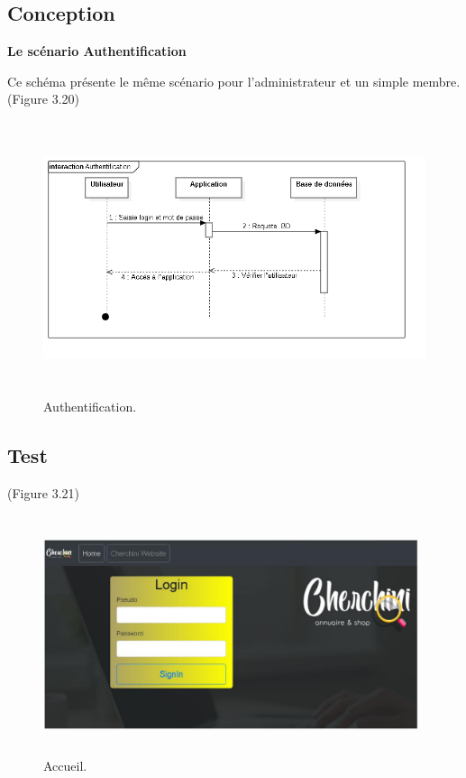 
\subsection{Conception}
\textbf{Le sc\'{e}nario \guillemotleft{} Authentification \guillemotright{}}

Ce sch\'{e}ma pr\'{e}sente le m\^{e}me sc\'{e}nario pour l'administrateur et un simple
membre.(Figure 3.20)

\begin{figure}[H]
\center
\includegraphics[width=14cm,height=8cm]{./figures/seq/A.png}
\caption{Authentification.}
\end{figure}

\newpage
\subsection{Test}

 (Figure 3.21)
\begin{figure}[H]
\center
\includegraphics[width=11cm,height=7cm]{./figures/pres/1.png}
\caption{Accueil.}

\end{figure}

